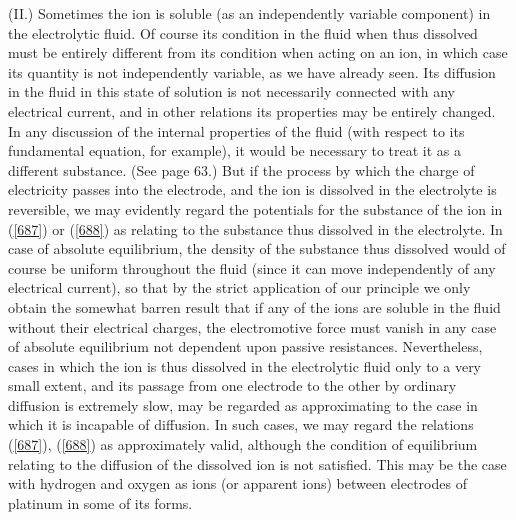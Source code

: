 \documentclass[12pt]{article}
\begin{document}
(II.) Sometimes the ion is soluble (as an independently variable component) in the electrolytic fluid. Of course its condition in the fluid when thus dissolved must be entirely different from its condition when acting on an ion, in which case its quantity is not independently variable, as we have already seen. Its diffusion in the fluid in this state of solution is not necessarily connected with any electrical current, and in other relations its properties may be entirely changed. In any discussion of the internal properties of the fluid (with respect to its fundamental equation, for example), it would be necessary to treat it as a different substance. (See page 63.) But if the process by which the charge of electricity passes into the electrode, and the ion is dissolved in the electrolyte is reversible, we may evidently regard the potentials for the substance of the ion in (\ref{687}) or (\ref{688}) as relating to the substance thus dissolved in the electrolyte. In case of absolute equilibrium, the density of the substance thus dissolved would of course be uniform throughout the fluid (since it can move independently of any electrical current), so that by the strict application of our principle we only obtain the somewhat barren result that if any of the ions are soluble in the fluid without their electrical charges, the electromotive force must vanish in any case of absolute equilibrium not dependent upon passive resistances. Nevertheless, cases in which the ion is thus dissolved in the electrolytic fluid only to a very small extent, and its passage from one electrode to the other by ordinary diffusion is extremely slow, may be regarded as approximating to the case in which it is incapable of diffusion. In such cases, we may regard the relations (\ref{687}), (\ref{688}) as approximately valid, although the condition of equilibrium relating to the diffusion of the dissolved ion is not satisfied. This may be the case with hydrogen and oxygen as ions (or apparent ions) between electrodes of platinum in some of its forms.
\end{document}

